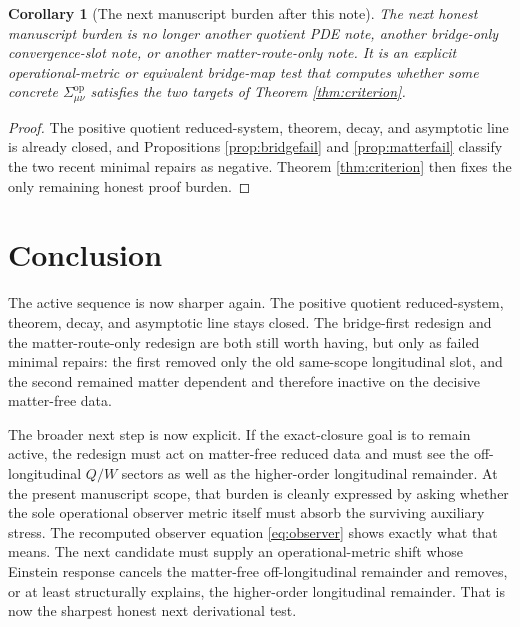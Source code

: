 \documentclass[11pt]{article}
\newcommand{\SigmaOp}{\Sigma^{\mathrm{op}}}
\newtheorem{corollary}{Corollary}
\begin{document}
\begin{corollary}[The next manuscript burden after this note]
\label{cor:next}
The next honest manuscript burden is no longer another quotient PDE note, another bridge-only convergence-slot note, or another matter-route-only note. It is an explicit operational-metric or equivalent bridge-map test that computes whether some concrete \(\SigmaOp_{\mu\nu}\) satisfies the two targets of Theorem \ref{thm:criterion}.
\end{corollary}

\begin{proof}
The positive quotient reduced-system, theorem, decay, and asymptotic line is already closed, and Propositions \ref{prop:bridgefail} and \ref{prop:matterfail} classify the two recent minimal repairs as negative. Theorem \ref{thm:criterion} then fixes the only remaining honest proof burden.
\end{proof}

\section{Conclusion}

The active sequence is now sharper again. The positive quotient reduced-system, theorem, decay, and asymptotic line stays closed. The bridge-first redesign and the matter-route-only redesign are both still worth having, but only as failed minimal repairs: the first removed only the old same-scope longitudinal slot, and the second remained matter dependent and therefore inactive on the decisive matter-free data.

The broader next step is now explicit. If the exact-closure goal is to remain active, the redesign must act on matter-free reduced data and must see the off-longitudinal \(Q/W\) sectors as well as the higher-order longitudinal remainder. At the present manuscript scope, that burden is cleanly expressed by asking whether the sole operational observer metric itself must absorb the surviving auxiliary stress. The recomputed observer equation \eqref{eq:observer} shows exactly what that means. The next candidate must supply an operational-metric shift whose Einstein response cancels the matter-free off-longitudinal remainder and removes, or at least structurally explains, the higher-order longitudinal remainder. That is now the sharpest honest next derivational test.
\end{document}
